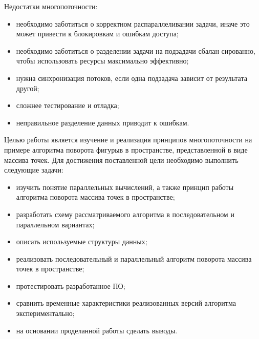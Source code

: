 Недостатки многопоточности:
\begin{itemize}
	\item необходимо заботиться о корректном распараллеливании задачи,
	иначе это может привести к блокировкам и ошибкам доступа;
	\item необходимо заботиться о разделении задачи на подзадачи сбалан­
	сированно, чтобы использовать ресурсы максимально эффективно;
	\item нужна синхронизация потоков, если одна подзадача зависит от
	результата другой;
	\item сложнее тестирование и отладка;
	\item неправильное разделение данных приводит к ошибкам.
\end{itemize}



Целью работы является изучение и реализация принципов многопоточности 
на примере алгоритма поворота фигурыв в пространстве, представленной 
в виде массива точек. 
Для достижения поставленной цели необходимо выполнить следующие задачи:
\begin{itemize}
	\item изучить понятие параллельных вычислений, а также принцип ра­боты 
	алгоритма поворота массива точек в пространстве;
	\item разработать схему рассматриваемого алгоритма в последовательном
	и параллельном вариантах;
	\item описать используемые структуры данных;
	\item реализовать последовательный и параллельный алгоритм поворо­та
	массива точек в пространстве;
	\item протестировать разработанное ПО;
	\item сравнить временные характеристики реализованных версий алго­ритма 
	экспериментально;
	\item на основании проделанной работы сделать выводы.
\end{itemize}




